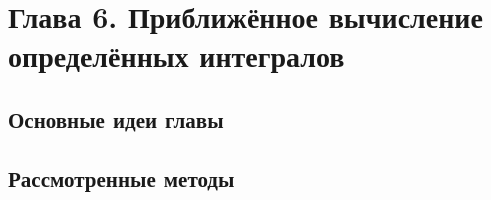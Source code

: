 \newpage
{}
\pagestyle{empty}
\vspace{0.5cm}

\section*{Глава 6. Приближённое вычисление определённых интегралов}

\subsection{Основные идеи главы} 

\subsection{Рассмотренные методы}
